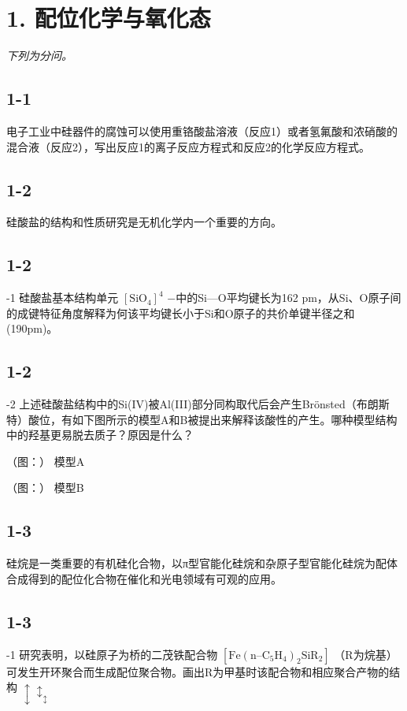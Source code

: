 \section*{1. 配位化学与氧化态}
\textit{下列为分问。}

\subsection*{1-1}
电⼦⼯业中硅器件的腐蚀可以使⽤重铬酸盐溶液（反应1）或者氢氟酸和浓硝酸的混合液（反应2），写出反应1的离⼦反应⽅程式和反应2的化学反应⽅程式。

\subsection*{1-2}
硅酸盐的结构和性质研究是⽆机化学内⼀个重要的⽅向。

\subsection*{1-2}
-1 硅酸盐基本结构单元 $\mathrm { [ S i O _ { 4 } ] ^ { 4 } }$ −中的Si—O平均键⻓为162 pm，从Si、O原⼦间的成键特征⻆度解释为何该平均键⻓⼩于Si和O原⼦的共价单键半径之和(190pm)。

\subsection*{1-2}
-2 上述硅酸盐结构中的Si(IV)被Al(III)部分同构取代后会产⽣Brönsted（布朗斯特）酸位，有如下图所⽰的模型A和B被提出来解释该酸性的产⽣。哪种模型结构中的羟基更易脱去质⼦？原因是什么？

（图：）
模型A

（图：）
模型B

\subsection*{1-3}
硅烷是⼀类重要的有机硅化合物，以π型官能化硅烷和杂原⼦型官能化硅烷为配体合成得到的配位化合物在催化和光电领域有可观的应⽤。

\subsection*{1-3}
-1 研究表明，以硅原⼦为桥的⼆茂铁配合物 $\mathrm { [ F e ( n – C _ { 5 } H _ { 4 } ) _ { 2 } S i R _ { 2 } ] }$ （R为烷基）可发⽣开环聚合⽽⽣成配位聚合物。画出R为甲基时该配合物和相应聚合产物的结构 $\updownarrow \updownarrow _ { \updownarrow }$

